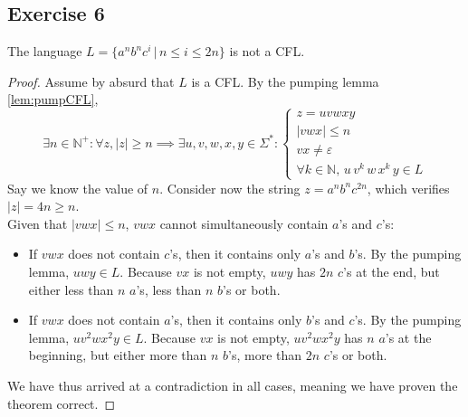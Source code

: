 {\subsection{Exercise 6}
\begin{theorem}
The language $L=\{a^nb^nc^i\,|\,n \leq i \leq 2n\}$ is not a CFL.
\end{theorem}
\begin{proof}
Assume by absurd that $L$ is a CFL. By the pumping lemma \eqref{lem:pumpCFL},
\begin{equation*}
	\exists n \in \mathbb{N}^+ \colon \forall z, |z|\geq n \implies \exists u, v, w, x, y \in \Sigma^* \colon 
	\begin{cases}
		z=uvwxy\\
		|vwx| \leq n\\
		vx \neq \varepsilon \\
		\forall k \in \mathbb{N},\,u\,v^k\,w\,x^k\,y \in L
	\end{cases}
\end{equation*}
Say we know the value of $n$. Consider now the string $z=a^nb^nc^{2n}$, which verifies $|z|=4n \geq n$. \\
Given that $|vwx|\leq n$, $vwx$ cannot simultaneously contain $a$'s and $c$'s:
\begin{itemize}
	\item If $vwx$ does not contain $c$'s, then it contains only $a$'s and $b$'s. By the pumping lemma, $uwy \in L$. Because $vx$ is not empty, $uwy$ has $2n$ $c$'s at the end, but either less than $n$ $a$'s, less than $n$ $b$'s or both.
	\item If $vwx$ does not contain $a$'s, then it contains only $b$'s and $c$'s. By the pumping lemma, $uv^2wx^2y \in L$. Because $vx$ is not empty, $uv^2wx^2y$ has $n$ $a$'s at the beginning, but either more than $n$ $b$'s, more than $2n$ $c$'s or both.
\end{itemize}
We have thus arrived at a contradiction in all cases, meaning we have proven the theorem correct.
\end{proof}
}

